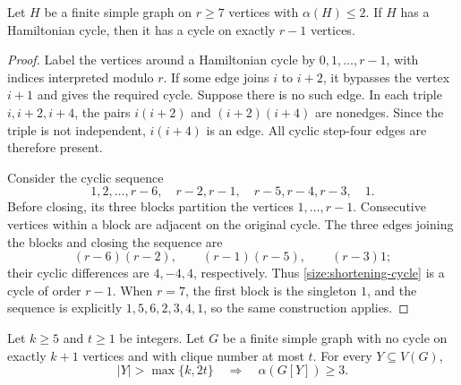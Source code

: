 \begin{lemma}\label{size:shortening}
Let $H$ be a finite simple graph on $r\ge7$ vertices with
$\alpha(H)\le2$.  If $H$ has a Hamiltonian cycle, then it has a cycle
on exactly $r-1$ vertices.
\end{lemma}

\begin{proof}
Label the vertices around a Hamiltonian cycle by $0,1,\ldots,r-1$, with
indices interpreted modulo $r$.  If some edge joins $i$ to $i+2$, it
bypasses the vertex $i+1$ and gives the required cycle.  Suppose there
is no such edge.  In each triple $i,i+2,i+4$, the pairs $i(i+2)$ and
$(i+2)(i+4)$ are nonedges.  Since the triple is not independent,
$i(i+4)$ is an edge.  All cyclic step-four edges are therefore present.

Consider the cyclic sequence
\begin{equation}\label{size:shortening-cycle}
 1,2,\ldots,r-6,\quad r-2,r-1,\quad r-5,r-4,r-3,\quad1.
\end{equation}
Before closing, its three blocks partition the vertices $1,\ldots,r-1$.
Consecutive vertices within a block are adjacent on the original cycle.
The three edges joining the blocks and closing the sequence are
\[
 (r-6)(r-2),\qquad (r-1)(r-5),\qquad (r-3)1;
\]
their cyclic differences are $4,-4,4$, respectively.  Thus
\eqref{size:shortening-cycle} is a cycle of order $r-1$.
When $r=7$, the first block is the singleton $1$, and the sequence is
explicitly $1,5,6,2,3,4,1$, so the same construction applies.
\end{proof}

\begin{lemma}\label{size:test}
Let $k\ge5$ and $t\ge1$ be integers.  Let $G$ be a finite simple graph
with no cycle on exactly $k+1$ vertices and with clique number at most
$t$.  For every $Y\subseteq V(G)$,
\[
 |Y|>\max\{k,2t\}\quad\Longrightarrow\quad\alpha(G[Y])\ge3.
\]
\end{lemma}

